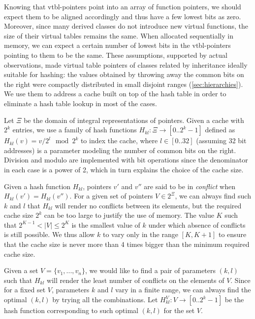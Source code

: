 Knowing that vtbl-pointers point into an array of function pointers, we should 
expect them to be aligned accordingly and thus have a few lowest bits as zero. 
Moreover, since many derived classes do not introduce new virtual functions, 
the size of their virtual tables remains the same. When allocated sequentially 
in memory, we can expect a certain number of lowest bits in the vtbl-pointers 
pointing to them to be the same.
These assumptions, supported by actual observations, made virtual table 
pointers of classes related by inheritance ideally suitable for hashing: the 
values obtained by throwing away the common bits on the right were compactly 
distributed in small disjoint ranges (\textsection\ref{sec:hierarchies}). We use 
them to address a cache built on top of the hash table in order to eliminate a 
hash table lookup in most of the cases.

Let $\Xi$ be the domain of integral representations of pointers. Given a cache 
with $2^k$ entries, we use a family of hash functions $H_{kl} : \Xi \rightarrow [0..2^k-1]$ 
defined as $H_{kl}(v)=v/2^l \mod 2^k$ to index the cache, where $l \in [0..32]$ 
(assuming 32 bit addresses) is a parameter modeling the number of common bits on 
the right. Division and modulo are implemented with bit operations since the
denominator in each case is a power of 2, which in turn explains the choice of 
the cache size.

Given a hash function $H_{kl}$, pointers $v'$ and $v''$ are said to be in 
\emph{conflict} when $H_{kl}(v')=H_{kl}(v'')$. For a given set of pointers 
$V \in 2^{\Xi}$, we can always find such $k$ and $l$ that $H_{kl}$ will render no  
conflicts between its elements, but the required cache size $2^k$ can be too 
large to justify the use of memory. The value $K$ such that $2^{K-1} < |V| \leq 2^K$ 
is the smallest value of $k$ under which absence of conflicts is still possible. 
We thus allow $k$ to vary only in the range $[K,K+1]$ to ensure that the cache size 
is never more than 4 times bigger than the minimum required cache size.

Given a set $V = \{v_1, ... , v_n\}$, we would like to find a pair of parameters 
$(k,l)$ such that $H_{kl}$ will render the least number of conflicts on the 
elements of $V$. Since for a fixed set $V$, parameters $k$ and $l$ vary in a 
finite range, we can always find the optimal $(k,l)$ by trying all the
combinations. Let $H_{kl}^V : V \rightarrow [0..2^k-1]$ be the hash function 
corresponding to such optimal $(k,l)$ for the set $V$. 

